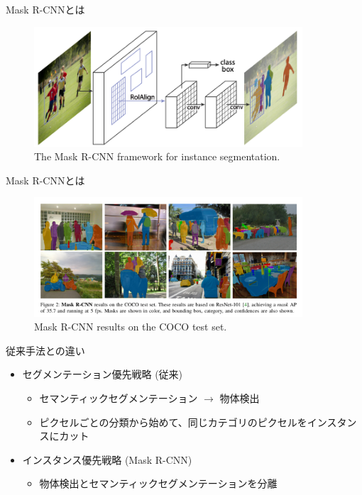 \documentclass[aspectratio=169, dvipdfmx, 11pt]{beamer}
\begin{document}
\begin{frame}{Mask R-CNNとは}
    \begin{figure}[htb]
		\centering
		\includegraphics[width=10cm]{./figures/framework.png}
        \caption{The Mask R-CNN framework for instance segmentation.}
    \end{figure}
\end{frame}

\begin{frame}{Mask R-CNNとは}
    \begin{figure}[htb]
		\centering
		\includegraphics[width=10cm]{./figures/resluts_coco.png}
        \caption{Mask R-CNN results on the COCO test set.}
    \end{figure}
\end{frame}


\begin{frame}{従来手法との違い}
	\begin{itemize}
    	\item セグメンテーション優先戦略 (従来) \\
        \begin{itemize}
        	\item セマンティックセグメンテーション $\rightarrow$ 物体検出 \\
        	\item ピクセルごとの分類から始めて、同じカテゴリのピクセルをインスタンスにカット \\
        \end{itemize}
        \item インスタンス優先戦略 (Mask R-CNN) \\
        \begin{itemize}
        	\item 物体検出とセマンティックセグメンテーションを分離 \\
        \end{itemize}
    \end{itemize}
\end{frame}
\end{document}
